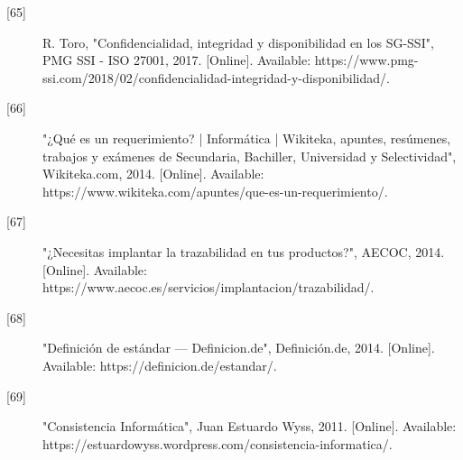 \begin{description}
		\item[\hypertarget{b65}{[65]}] R. Toro, "Confidencialidad, integridad y disponibilidad en los SG-SSI", PMG SSI - ISO 27001, 2017. [Online]. Available: https://www.pmg-ssi.com/2018/02/confidencialidad-integridad-y-disponibilidad/. 
		
		\item[\hypertarget{b66}{[66]}] "¿Qué es un requerimiento? | Informática | Wikiteka, apuntes, resúmenes, trabajos y exámenes de Secundaria, Bachiller, Universidad y Selectividad", Wikiteka.com, 2014. [Online]. Available: https://www.wikiteka.com/apuntes/que-es-un-requerimiento/. 
		
		\item[\hypertarget{b67}{[67]}] "¿Necesitas implantar la trazabilidad en tus productos?", AECOC, 2014. [Online]. Available: https://www.aecoc.es/servicios/implantacion/trazabilidad/. 
		
		\item[\hypertarget{b68}{[68]}] "Definición de estándar — Definicion.de", Definición.de, 2014. [Online]. Available: https://definicion.de/estandar/. 
		
		\item[\hypertarget{b69}{[69]}] "Consistencia Informática", Juan Estuardo Wyss, 2011. [Online]. Available: https://estuardowyss.wordpress.com/consistencia-informatica/. 
\end{description}